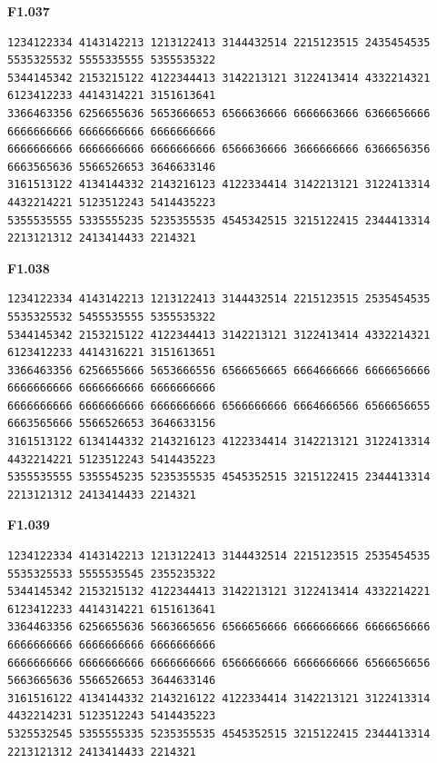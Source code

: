 \noindent\begin{minipage}{\linewidth}\textbf{F1.037}
\begin{lstlisting}
1234122334 4143142213 1213122413 3144432514 2215123515 2435454535 5535325532 5555335555 5355535322
5344145342 2153215122 4122344413 3142213121 3122413414 4332214321 6123412233 4414314221 3151613641
3366463356 6256655636 5653666653 6566636666 6666663666 6366656666 6666666666 6666666666 6666666666
6666666666 6666666666 6666666666 6566636666 3666666666 6366656356 6663565636 5566526653 3646633146
3161513122 4134144332 2143216123 4122334414 3142213121 3122413314 4432214221 5123512243 5414435223
5355535555 5335555235 5235355535 4545342515 3215122415 2344413314 2213121312 2413414433 2214321
\end{lstlisting}
\end{minipage}\par\smallskip

\noindent\begin{minipage}{\linewidth}\textbf{F1.038}
\begin{lstlisting}
1234122334 4143142213 1213122413 3144432514 2215123515 2535454535 5535325532 5455535555 5355535322
5344145342 2153215122 4122344413 3142213121 3122413414 4332214321 6123412233 4414316221 3151613651
3366463356 6256655666 5653666556 6566656665 6664666666 6666656666 6666666666 6666666666 6666666666
6666666666 6666666666 6666666666 6566666666 6664666566 6566656655 6663565666 5566526653 3646633156
3161513122 6134144332 2143216123 4122334414 3142213121 3122413314 4432214221 5123512243 5414435223
5355535555 5355545235 5235355535 4545352515 3215122415 2344413314 2213121312 2413414433 2214321
\end{lstlisting}
\end{minipage}\par\smallskip

\noindent\begin{minipage}{\linewidth}\textbf{F1.039}
\begin{lstlisting}
1234122334 4143142213 1213122413 3144432514 2215123515 2535454535 5535325533 5555535545 2355235322
5344145342 2153215132 4122344413 3142213121 3122413414 4332214221 6123412233 4414314221 6151613641
3364463356 6256655636 5663665656 6566656666 6666666666 6666656666 6666666666 6666666666 6666666666
6666666666 6666666666 6666666666 6566666666 6666666666 6566656656 5663665636 5566526653 3644633146
3161516122 4134144332 2143216122 4122334414 3142213121 3122413314 4432214231 5123512243 5414435223
5325532545 5355555335 5235355535 4545352515 3215122415 2344413314 2213121312 2413414433 2214321
\end{lstlisting}
\end{minipage}\par\smallskip

